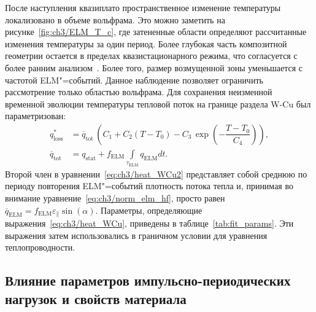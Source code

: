 После наступления квазиплато пространственное изменение температуры локализовано в объеме вольфрама. Это можно заметить на рисунке~\cref{fig:ch3/ELM_T_c}, где затененные области определяют рассчитанные изменения температуры за один период. Более глубокая часть композитной геометрии остается в пределах квазистационарного режима, что согласуется с более ранним анализом~\cite{Marenkov2012a}. Более того, размер возмущенной зоны уменьшается с частотой ELM"=событий. Данное наблюдение позволяет ограничить рассмотрение только областью вольфрама. Для сохранения неизменной временной эволюции температуры тепловой поток на границе раздела W-Cu был параметризован:
\begin{subequations}
	\label{eq:ch3/heat_WCu}
	\begin{align}
		q^*_{\mathrm{loss}}         & =\overline{q}_{\mathrm{tot}}\,\left(C_1+C_2(T-T_0)-C_3\,\exp\left( -\dfrac{T-T_0}{C_4}\right)\right),\label{eq:ch3/heat_WCu1} \\
		\overline{q}_{\mathrm{tot}} & =q_{\mathrm{stat}}+f_{\mathrm{ELM}}\int\limits_{\tau_{\mathrm{ELM}}}q_{\mathrm{ELM}}dt. \label{eq:ch3/heat_WCu2}
	\end{align}
\end{subequations}
Второй член в уравнении~\cref{eq:ch3/heat_WCu2} представляет собой среднюю по периоду повторения ELM"=событий плотность потока тепла и, принимая во внимание уравнение~\cref{eq:ch3/norm_elm_hf}, просто равен $\overline{q}_{\mathrm{ELM}}=f_{\mathrm{ELM}}\varepsilon_{\parallel}\sin(\alpha)$. Параметры, определяющие выражения~\cref{eq:ch3/heat_WCu}, приведены в таблице~\cref{tab:fit_params}. Эти выражения затем использовались в граничном условии для уравнения теплопроводности.

\subsection{Влияние параметров импульсно-периодических нагрузок и свойств материала}\label{subsec:ch3/sec2/subsec5}

